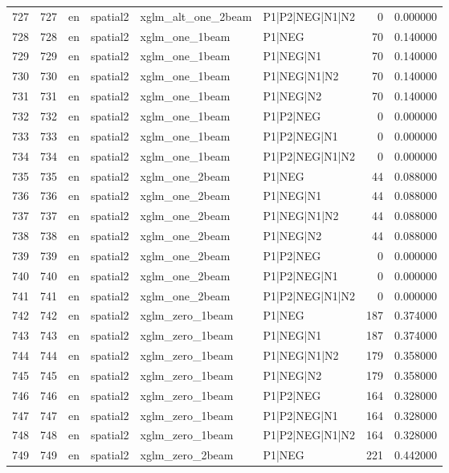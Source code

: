 \begin{tabular}{lrllllrr}
727 & 727 & en & spatial2 & xglm_alt_one_2beam & P1|P2|NEG|N1|N2 & 0 & 0.000000 \\
728 & 728 & en & spatial2 & xglm_one_1beam & P1|NEG & 70 & 0.140000 \\
729 & 729 & en & spatial2 & xglm_one_1beam & P1|NEG|N1 & 70 & 0.140000 \\
730 & 730 & en & spatial2 & xglm_one_1beam & P1|NEG|N1|N2 & 70 & 0.140000 \\
731 & 731 & en & spatial2 & xglm_one_1beam & P1|NEG|N2 & 70 & 0.140000 \\
732 & 732 & en & spatial2 & xglm_one_1beam & P1|P2|NEG & 0 & 0.000000 \\
733 & 733 & en & spatial2 & xglm_one_1beam & P1|P2|NEG|N1 & 0 & 0.000000 \\
734 & 734 & en & spatial2 & xglm_one_1beam & P1|P2|NEG|N1|N2 & 0 & 0.000000 \\
735 & 735 & en & spatial2 & xglm_one_2beam & P1|NEG & 44 & 0.088000 \\
736 & 736 & en & spatial2 & xglm_one_2beam & P1|NEG|N1 & 44 & 0.088000 \\
737 & 737 & en & spatial2 & xglm_one_2beam & P1|NEG|N1|N2 & 44 & 0.088000 \\
738 & 738 & en & spatial2 & xglm_one_2beam & P1|NEG|N2 & 44 & 0.088000 \\
739 & 739 & en & spatial2 & xglm_one_2beam & P1|P2|NEG & 0 & 0.000000 \\
740 & 740 & en & spatial2 & xglm_one_2beam & P1|P2|NEG|N1 & 0 & 0.000000 \\
741 & 741 & en & spatial2 & xglm_one_2beam & P1|P2|NEG|N1|N2 & 0 & 0.000000 \\
742 & 742 & en & spatial2 & xglm_zero_1beam & P1|NEG & 187 & 0.374000 \\
743 & 743 & en & spatial2 & xglm_zero_1beam & P1|NEG|N1 & 187 & 0.374000 \\
744 & 744 & en & spatial2 & xglm_zero_1beam & P1|NEG|N1|N2 & 179 & 0.358000 \\
745 & 745 & en & spatial2 & xglm_zero_1beam & P1|NEG|N2 & 179 & 0.358000 \\
746 & 746 & en & spatial2 & xglm_zero_1beam & P1|P2|NEG & 164 & 0.328000 \\
747 & 747 & en & spatial2 & xglm_zero_1beam & P1|P2|NEG|N1 & 164 & 0.328000 \\
748 & 748 & en & spatial2 & xglm_zero_1beam & P1|P2|NEG|N1|N2 & 164 & 0.328000 \\
749 & 749 & en & spatial2 & xglm_zero_2beam & P1|NEG & 221 & 0.442000 \\

\end{tabular}
